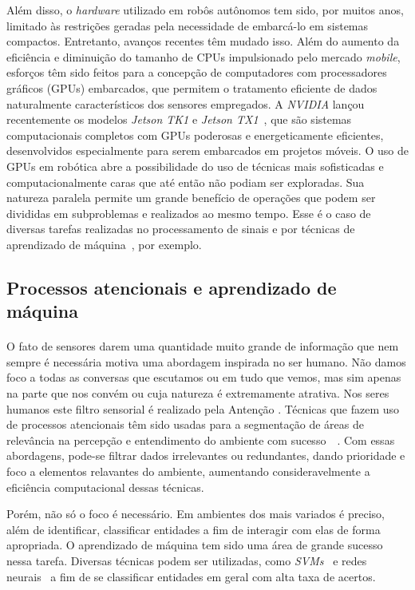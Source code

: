 \documentclass[11pt]{article}
\newcommand{\tit}[1]{\textit{#1}}
\begin{document}
Além disso, o \tit{hardware} utilizado em robôs autônomos tem sido, por muitos 
anos, limitado às restrições geradas pela necessidade de embarcá-lo em sistemas compactos. Entretanto,
avanços recentes têm mudado isso. Além do aumento da eficiência e diminuição do tamanho de CPUs impulsionado
pelo mercado \tit{mobile}, esforços têm sido feitos para a concepção de 
computadores com processadores gráficos (GPUs) embarcados, que permitem o tratamento eficiente de dados naturalmente característicos dos sensores empregados.  
A \tit{NVIDIA} lançou recentemente os modelos 
\tit{Jetson TK1} e \tit{Jetson TX1}~\cite{jetson}, que são sistemas 
computacionais completos com GPUs poderosas e energeticamente eficientes, desenvolvidos especialmente para serem embarcados em projetos móveis.
O uso de GPUs em robótica abre a possibilidade do uso de técnicas mais 
sofisticadas e computacionalmente caras que até então não podiam ser exploradas.
Sua natureza paralela permite um grande benefício de operações que podem ser
divididas em subproblemas e realizados ao mesmo tempo. 
Esse é o caso de diversas tarefas realizadas no processamento de sinais e por técnicas 
de aprendizado de máquina~\cite{gpu}, por exemplo. 

\subsection{Processos atencionais e aprendizado de máquina}
\paragraph{}
O fato de sensores darem uma quantidade muito grande de informação que nem 
sempre é necessária motiva uma abordagem inspirada no ser humano.
Não damos foco a todas as conversas que escutamos ou em tudo que vemos, mas sim 
apenas na parte que nos convém ou cuja natureza é extremamente atrativa. Nos seres humanos este filtro sensorial é realizado pela Antenção \cite{Dux_Marois_2009}. Técnicas que fazem uso de processos atencionais têm sido usadas para a 
segmentação de áreas de relevância na percepção e entendimento do 
ambiente com sucesso~\cite{bio}~\cite{esther}.
Com essas abordagens, pode-se filtrar dados irrelevantes ou
redundantes, dando prioridade e foco a elementos relavantes do ambiente, aumentando consideravelmente a eficiência computacional dessas
técnicas. 

Porém, não só o foco é necessário. Em ambientes dos mais variados é preciso, além
de identificar, classificar entidades a fim de interagir com elas de forma
apropriada. 
O aprendizado de máquina tem sido uma área de grande sucesso nessa tarefa.
Diversas técnicas podem ser utilizadas, como \tit{SVMs}~\cite{svm} 
e redes neurais~\cite{nn} a fim de se classificar entidades em geral com 
alta taxa de acertos. 
\end{document}

